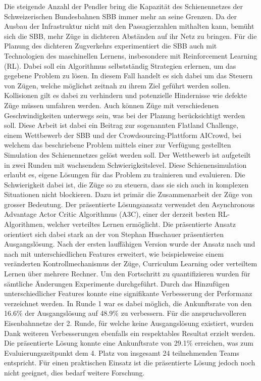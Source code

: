 Die steigende Anzahl der Pendler bring die Kapazität des Schienennetzes der Schweizerischen Bundesbahnen SBB immer mehr an seine Grenzen. Da der Ausbau der Infrastruktur nicht mit den Passagierzahlen mithalten kann, bemüht sich die SBB, mehr Züge in dichteren Abständen auf ihr Netz zu bringen.
Für die Planung des dichteren Zugverkehrs experimentiert die SBB auch mit Technologien des maschinellen Lernens, insbesondere mit Reinforcement Learning (RL). Dabei soll ein Algorithmus selbstständig Strategien erlernen, um das gegebene Problem zu lösen. In diesem Fall handelt es sich dabei um das Steuern von Zügen, welche möglichst zeitnah zu ihrem Ziel geführt werden sollen. Kollisionen gilt es dabei zu verhindern und potenzielle Hindernisse wie defekte Züge müssen umfahren werden. Auch können Züge mit verschiedenen Geschwindigkeiten unterwegs sein, was bei der Planung berücksichtigt werden soll. Diese Arbeit ist dabei ein Beitrag zur sogenannten Flatland Challenge, einem Wettbewerb der SBB und der Crowdsourcing-Plattform AICrowd, bei welchem das beschriebene Problem mittels einer zur Verfügung gestellten Simulation des Schienennetzes gelöst werden soll. Der Wettbewerb ist aufgeteilt in zwei Runden mit wachsendem Schwierigkeitslevel.
Diese Schienensimulation erlaubt es, eigene Lösungen für das Problem zu trainieren und evaluieren. Die Schwierigkeit dabei ist, die Züge so zu steuern, dass sie sich auch in komplexen Situationen nicht blockieren. Dazu ist primär die Zusammenarbeit der Züge von grosser Bedeutung.
Der präsentierte Lösungsansatz verwendet den Asynchronous Advantage Actor Critic Algorithmus (A3C), einer der derzeit besten RL-Algorithmen, welcher verteiltes Lernen ermöglicht. Die präsentierte Ansatz orientiert sich dabei stark an der von Stephan Huschauer präsentierten Ausgangslösung.
Nach der ersten lauffähigen Version wurde der Ansatz nach und nach mit unterschiedlichen Features erweitert, wie beispielsweise einem veränderten Kontrollmechanismus der Züge, Curriculum Learning oder verteiltem Lernen über mehrere Rechner.
Um den Fortschritt zu quantifizieren wurden für sämtliche Änderungen Experimente durchgeführt. Durch das Hinzufügen unterschiedlicher Features konnte eine signifikante Verbesserung der Performanz verzeichnet werden. In Runde 1 war es dabei möglich, die Ankunftsrate von den 16.6\% der Ausgangslösung auf 48.9\% zu verbessern.
Für die anspruchsvolleren Eisenbahnnetze der 2. Runde, für welche keine Ausgangslösung existiert, wurden Dank weiteren Verbesserungen ebenfalls ein respektables Resultat erzielt werden. Die präsentierte Lösung konnte eine Ankunftsrate von 29.1\% erreichen, was zum Evaluierungszeitpunkt dem 4. Platz von insgesamt 24 teilnehmenden Teams entspricht. Für einen praktischen Einsatz ist die präsentierte Lösung jedoch noch nicht geeignet, dies bedarf weitere Forschung.
\newpage
\thispagestyle{empty}

